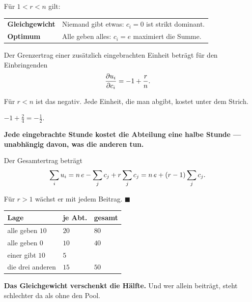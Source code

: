 \begin{merksatz}
Für $1 < r < n$ gilt:
\begin{center}
{\small
\renewcommand{\arraystretch}{1.5}
\begin{tabular}{@{}P{2.4cm}P{6.2cm}@{}}
\toprule
\textbf{Gleichgewicht} & Niemand gibt etwas: $c_i = 0$ ist strikt dominant.\\
\textbf{Optimum} & Alle geben alles: $c_i = e$ maximiert die Summe.\\
\bottomrule
\end{tabular}}
\end{center}

Der Grenzertrag einer zusätzlich eingebrachten Einheit beträgt für den Einbringenden
\[ \frac{\partial u_i}{\partial c_i} = -1 + \frac{r}{n} . \]

Für $r < n$ ist das negativ. Jede Einheit, die man abgibt, kostet unter dem Strich.

 $-1+\tfrac24 = -\tfrac12$.

\begin{center}
\begin{minipage}{0.9\textwidth}
\textbf{Jede eingebrachte Stunde kostet die Abteilung eine halbe Stunde --- unabhängig davon, was die anderen tun.}
\end{minipage}
\end{center}

Der Gesamtertrag beträgt
\[ \sum_i u_i = n\,e - \sum_j c_j + r\sum_j c_j = n\,e + (r-1)\sum_j c_j . \]

Für $r > 1$ wächst er mit jedem Beitrag. $\blacksquare$

\begin{center}
{\small
\renewcommand{\arraystretch}{1.5}
\begin{tabular}{@{}P{2.8cm}P{2.0cm}P{2.6cm}@{}}
\toprule
\textbf{Lage} & \textbf{je Abt.} & \textbf{gesamt}\\
\midrule
alle geben $10$ & $20$ & $80$\\
alle geben $0$ & $10$ & $40$\\
\midrule
einer gibt $10$ & $5$ & \\
die drei anderen & $15$ & $50$\\
\bottomrule
\end{tabular}}
\end{center}

\begin{center}
\begin{minipage}{0.9\textwidth}
\textbf{Das Gleichgewicht verschenkt die Hälfte.} Und wer allein beiträgt, steht schlechter da als ohne den Pool.
\end{minipage}
\end{center}


\end{merksatz}

